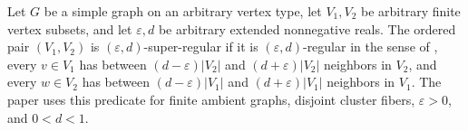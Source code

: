 \begin{definition}
Let $G$ be a simple graph on an arbitrary vertex type, let $V_1,V_2$ be arbitrary finite vertex subsets, and let $\varepsilon,d$ be arbitrary extended nonnegative reals.  The ordered pair $(V_1,V_2)$ is $(\varepsilon,d)$-super-regular if it is $(\varepsilon,d)$-regular in the sense of , every $v\in V_1$ has between $(d-\varepsilon)|V_2|$ and $(d+\varepsilon)|V_2|$ neighbors in $V_2$, and every $w\in V_2$ has between $(d-\varepsilon)|V_1|$ and $(d+\varepsilon)|V_1|$ neighbors in $V_1$.  The paper uses this predicate for finite ambient graphs, disjoint cluster fibers, $\varepsilon>0$, and $0<d<1$.
\end{definition}

